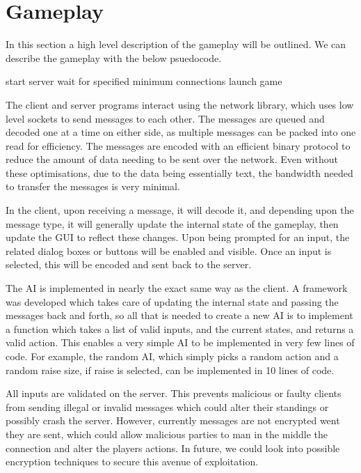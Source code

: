 \section{Gameplay}
In this section a high level description of the gameplay will be outlined.
We can describe the gameplay with the below psuedocode.

\vspace{0.4cm}

\begin{algorithm}[H]
    start server\;
    wait for specified minimum connections\;
    launch game\;
\end{algorithm}

\vspace{0.4cm}

The client and server programs interact using the network library, which
uses low level sockets to send messages to each other. The messages are queued
and decoded one at a time on either side, as multiple messages can be packed
into one read for efficiency. The messages are encoded with an efficient binary
protocol to reduce the amount of data needing to be sent over the network.
Even without these optimisations, due to the data being essentially text, the
bandwidth needed to transfer the messages is very minimal.

In the client, upon receiving a message, it will decode it, and depending upon
the message type, it will generally update the internal state of the gameplay,
then update the GUI to reflect these changes. Upon being prompted for an
input, the related dialog boxes or buttons will be enabled and visible.
Once an input is selected, this will be encoded and sent back to the server.

The AI is implemented in nearly the exact same way as the client. A framework
was developed which takes care of updating the internal state and passing the
messages back and forth, so all that is needed to create a new AI is to
implement a function which takes a list of valid inputs, and the current
states, and returns a valid action. This enables a very simple AI to be
implemented in very few lines of code. For example, the random AI, which simply
picks a random action and a random raise size, if raise is selected, can
be implemented in 10 lines of code.

All inputs are validated on the server. This prevents malicious or faulty
clients from sending illegal or invalid messages which could alter their
standings or possibly crash the server. However, currently messages are not
encrypted went they are sent, which could allow malicious parties to man in the
middle the connection and alter the players actions. In future, we could look
into possible encryption techniques to secure this avenue of exploitation.
